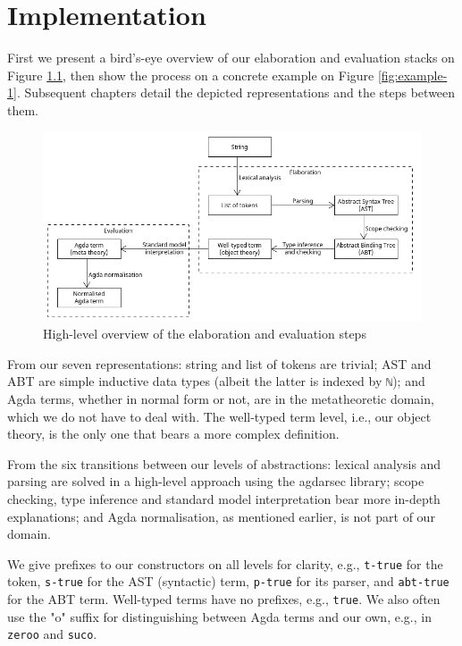 \chapter{Implementation}
\label{ch:Implementation}

First we present a bird's-eye overview of our elaboration and evaluation stacks on Figure \ref{fig:architecture}, then show the process on a concrete example on Figure \ref{fig:example-1}. Subsequent chapters detail the depicted representations and the steps between them.

\begin{figure}[h!]
	\centering
	\includegraphics[width=1.0\textwidth]{../images/architecture.png}
	\caption{High-level overview of the elaboration and evaluation steps}
	\label{fig:architecture}
\end{figure}

From our seven representations: string and list of tokens are trivial; AST and ABT are simple inductive data types (albeit the latter is indexed by \verb$ℕ$); and Agda terms, whether in normal form or not, are in the metatheoretic domain, which we do not have to deal with. The well-typed term level, i.e., our object theory, is the only one that bears a more complex definition.

From the six transitions between our levels of abstractions: lexical analysis and parsing are solved in a high-level approach using the agdarsec library; scope checking, type inference and standard model interpretation bear more in-depth explanations; and Agda normalisation, as mentioned earlier, is not part of our domain.

We give prefixes to our constructors on all levels for clarity, e.g., \verb$t-true$ for the token, \verb$s-true$ for the AST (syntactic) term, \verb$p-true$ for its parser, and \verb$abt-true$ for the ABT term. Well-typed terms have no prefixes, e.g., \verb$true$. We also often use the "o" suffix for distinguishing between Agda terms and our own, e.g., in \verb$zeroo$ and \verb$suco$.

